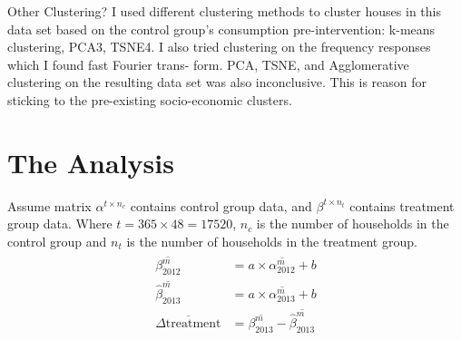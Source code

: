 \documentclass{beamer}
\begin{document}
\begin{frame}{Other Clustering?}
  I used different clustering methods to cluster houses in this data set based on the control group’s consumption pre-intervention: k-means clustering, PCA3, TSNE4. I also tried clustering on the frequency responses which I found fast Fourier trans- form. PCA, TSNE, and Agglomerative clustering on the resulting data set was also inconclusive. This is reason for sticking to the pre-existing socio-economic clusters.
\end{frame}


\section{The Analysis}

\begin{frame}
  Assume matrix $\alpha^{t \times n_c}$ contains control group data, and $\beta^{t \times n_t}$ contains treatment group data. Where $t = 365 \times 48 = 17520$, $n_c$ is the number of households in the control group and $n_t$ is the number of households in the treatment group.
  \begin{align}
    \begin{split}
      \overline{\beta^m_{2012}} &= a \times \overline{\alpha^m_{2012}} + b \\
      \overline{\hat{\beta}^m_{2013}} &= a \times \overline{\alpha^m_{2013}} + b \\
      \overline{\Delta\mbox{treatment}} &= \overline{\beta^m_{2013}} - \overline{\hat{\beta}^m_{2013}}
    \end{split}
  \end{align}
\end{frame}
\end{document}
